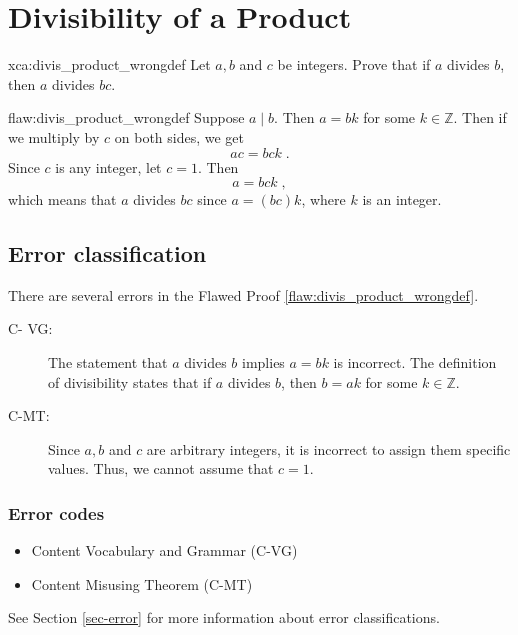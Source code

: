 \section{Divisibility of a Product }

\begin{xca}{xca:divis_product_wrongdef}
Let $a,b$ and $c$ be integers. Prove that if $a$ divides $b$, then $a$ divides $bc$. 
\end{xca}

\begin{flaw}{flaw:divis_product_wrongdef} %
Suppose $a \mid b$. Then $a = bk$ for some $k \in \mathbb{Z}.$ Then if we multiply by $c$ on both sides, we get
\[ ac = bck\;. \]
Since $c$ is any integer, let $c=1$. Then
\[ a = bck\;, \]
which means that $a$ divides $bc$ since $a = (bc)k$, where $k$ is an integer. 

\end{flaw}

\clearpage
\subsection{Error classification}


There are several errors
 in the Flawed Proof \ref{flaw:divis_product_wrongdef}. %

 
 \begin{description}
 	\item[C- VG: ] The statement that $a$ divides $b$ implies $a = bk$ is incorrect. The definition of divisibility states that if $a$ divides $b$, then $b = ak$ for some $k \in \mathbb{Z}.$
 	\item[C-MT: ] Since $a,b$ and $c$ are arbitrary integers, it is incorrect to assign them specific values. Thus, we cannot assume that $c=1$.
 \end{description}

 
\subsubsection{Error codes}
\begin{itemize}
	\item 	Content Vocabulary and Grammar (C-VG)
	\item 	Content Misusing Theorem (C-MT)
\end{itemize}
See Section \ref{sec-error} for more information about error classifications.

